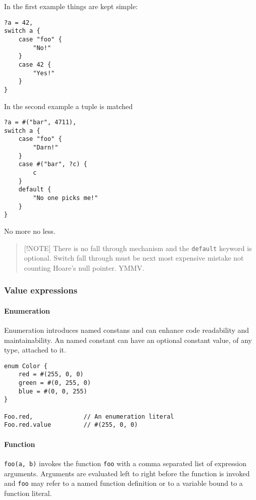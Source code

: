 In the first example things are kept simple:

\begin{verbatim}
?a = 42,
switch a {
    case "foo" {
        "No!"
    }
    case 42 {
        "Yes!"
    }
}
\end{verbatim}

In the second example a tuple is matched

\begin{verbatim}
?a = #("bar", 4711),
switch a {
    case "foo" {
        "Darn!"
    }
    case #("bar", ?c) {
        c
    }
    default {
        "No one picks me!"
    }
}
\end{verbatim}

No more no less.

\begin{quote}
{[}!NOTE{]} There is no fall through mechanism and the \texttt{default}
keyword is optional. Switch fall through must be next most expensive
mistake not counting Hoare's null pointer. YMMV.
\end{quote}

\hypertarget{value-expressions}{%
\subsubsection{Value expressions}\label{value-expressions}}

\hypertarget{enumeration}{%
\paragraph{Enumeration}\label{enumeration}}

Enumeration introduces named constans and can enhance code readability
and maintainability. An named constant can have an optional constant
value, of any type, attached to it.

\begin{verbatim}
enum Color {
    red = #(255, 0, 0)
    green = #(0, 255, 0)
    blue = #(0, 0, 255)
}

Foo.red,              // An enumeration literal
Foo.red.value         // #(255, 0, 0)
\end{verbatim}

\hypertarget{function}{%
\paragraph{Function}\label{function}}

\texttt{foo(a,\ b)} invokes the function \texttt{foo} with a comma
separated list of expression arguments. Arguments are evaluated left to
right before the function is invoked and \texttt{foo} may refer to a
named function definition or to a variable bound to a function literal.

